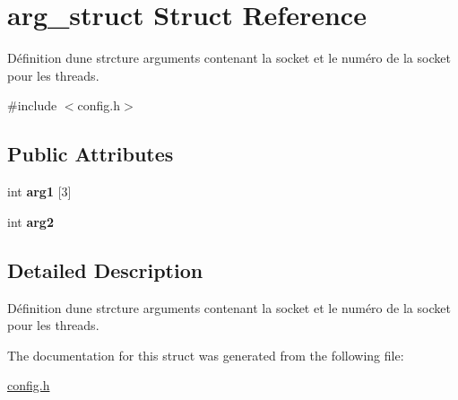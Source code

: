 \hypertarget{structarg__struct}{}\section{arg\+\_\+struct Struct Reference}
\label{structarg__struct}


Définition d\textquotesingle{}une strcture arguments contenant la socket et le numéro de la socket pour les threads.  




{\ttfamily \#include $<$config.\+h$>$}

\subsection*{Public Attributes}
\begin{DoxyCompactItemize}
\item 
\mbox{\label{structarg__struct_a5426e80ed610c1345d04f12fde446669}} 
int {\bfseries arg1} \mbox{[}3\mbox{]}
\item 
\mbox{\label{structarg__struct_a36407e45b3298112d7931b9c7b2a1c83}} 
int {\bfseries arg2}
\end{DoxyCompactItemize}


\subsection{Detailed Description}
Définition d\textquotesingle{}une strcture arguments contenant la socket et le numéro de la socket pour les threads. 



The documentation for this struct was generated from the following file\+:\begin{DoxyCompactItemize}
\item 
\mbox{\hyperlink{config_8h}{config.\+h}}\end{DoxyCompactItemize}
